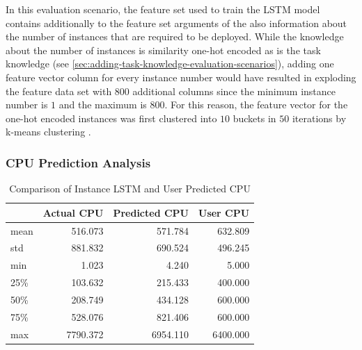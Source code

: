     In this evaluation scenario, the feature set used to train the LSTM model contains additionally to the feature set arguments of the  also information about the number of instances that are required to be deployed. While the knowledge about the number of instances is similarity one-hot encoded as is the task knowledge (see \ref{sec:adding-task-knowledge-evaluation-scenarios}), adding one feature vector column for every instance number would have resulted in exploding the feature data set with 800 additional columns since the minimum instance number is $1$ and the maximum is $800$.
    For this reason, the feature vector for the one-hot encoded instances was first clustered into $10$ buckets in $50$ iterations by k-means clustering \cite{hartiganAlgorithm136Kmeans1979}.


    \subsubsection{CPU Prediction Analysis}
    \label{sec:cpu-prediction-analysis-instance-knowledge-lstm-evaluation}

      \begin{table}
        \centering
        \caption{Comparison of Instance LSTM and User Predicted CPU}
        \label{tab:comparison-instance-lstm-user-predicted-cpu}

        \begin{tabular}{|l|rrr|}
          \toprule
          {} &  Actual CPU &  Predicted CPU &  User CPU \\
          \midrule
          mean &           516.073 &              571.784 &        632.809 \\
          std  &           881.832 &              690.524 &        496.245 \\
          min  &             1.023 &                4.240 &          5.000 \\
          25\%  &           103.632 &              215.433 &        400.000 \\
          50\%  &           208.749 &              434.128 &        600.000 \\
          75\%  &           528.076 &              821.406 &        600.000 \\
          max  &          7790.372 &             6954.110 &       6400.000 \\
          \bottomrule
        \end{tabular}
      \end{table}
      

